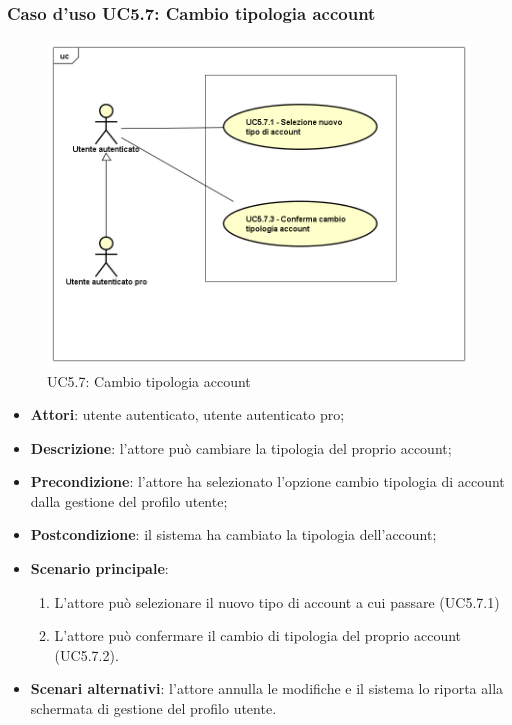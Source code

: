 \subsubsection{Caso d'uso UC5.7: Cambio tipologia account}
\label{UC5.7}
\begin{figure}[h]
	\centering
	\includegraphics[scale=0.5,keepaspectratio]{UML/UC5_7.png}
	\caption{UC5.7: Cambio tipologia account}
\end{figure}

\begin{itemize}
	\item \textbf{Attori}: utente autenticato, utente autenticato pro;
	\item \textbf{Descrizione}: l'attore può cambiare la tipologia del proprio account; 
	\item \textbf{Precondizione}:  l'attore ha selezionato l'opzione cambio tipologia di account dalla gestione del profilo utente;
	\item \textbf{Postcondizione}: il sistema ha cambiato la tipologia dell'account;
	\item \textbf{Scenario principale}:
	\begin{enumerate}
		\item L'attore può selezionare il nuovo tipo di account a cui passare (UC5.7.1)
		\item L'attore può confermare il cambio di tipologia del proprio account (UC5.7.2).
	\end{enumerate}
	\item \textbf{Scenari alternativi}: l'attore annulla le modifiche e il sistema lo riporta alla schermata di gestione del profilo utente.
\end{itemize}

